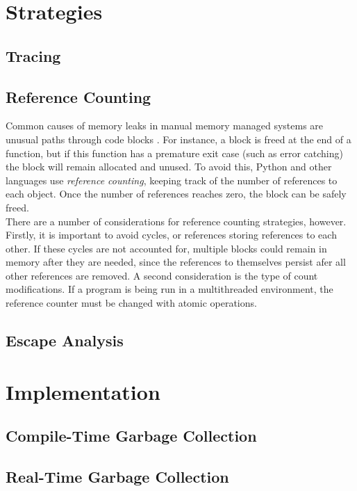 \documentclass{article}
\begin{document}
\section{Strategies}
\subsection{Tracing}
\subsection{Reference Counting}
Common causes of memory leaks in manual memory managed systems are unusual paths through code blocks \cite{pythDocs}. For instance, a block is freed at the end of a function, but if this function has a premature exit case (such as error catching) the block will remain allocated and unused. To avoid this, Python and other languages use {\it reference counting}, keeping track of the number of references to each object. Once the number of references reaches zero, the block can be safely freed.\\

There are a number of considerations for reference counting strategies, however. Firstly, it is important to avoid cycles, or references storing references to each other. If these cycles are not accounted for, multiple blocks could remain in memory after they are needed, since the references to themselves persist afer all other references are removed. A second consideration is the type of count modifications. If a program is being run in a multithreaded environment, the reference counter must be changed with atomic operations.\\
\subsection{Escape Analysis}

\section{Implementation}
\subsection{Compile-Time Garbage Collection}
\subsection{Real-Time Garbage Collection}
\end{document}
